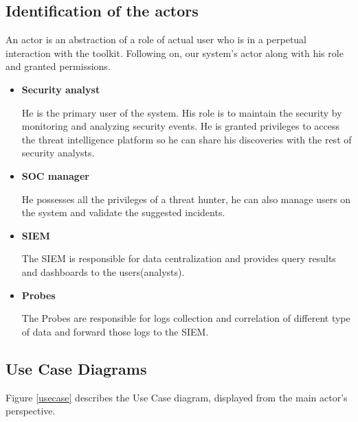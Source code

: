 \subsection {Identification of the actors}
An actor is an abstraction of a role of actual user who is in a perpetual interaction with the toolkit. Following on, our system's actor along with his role and granted permissions.


\begin{itemize}[label={$\checkmark$}]
\item \textbf { Security analyst } 

He is the primary user of the system. His role is to maintain the security by monitoring and analyzing security events. He is granted privileges to access the threat intelligence platform so he can share his discoveries with the rest of security analysts.
\item \textbf { SOC manager }

He possesses all the privileges of a threat hunter, he can also manage users on the system and validate the suggested incidents.
\item \textbf { SIEM }

The SIEM is responsible for data centralization and provides query results and dashboards to the users(analysts).
\item \textbf { Probes }

The Probes are responsible for logs collection and correlation of different type of data and forward those logs to the SIEM.
\end{itemize}

\subsection {Use Case Diagrams}

Figure \ref{usecase} describes the Use Case diagram, displayed from the main actor's perspective.


